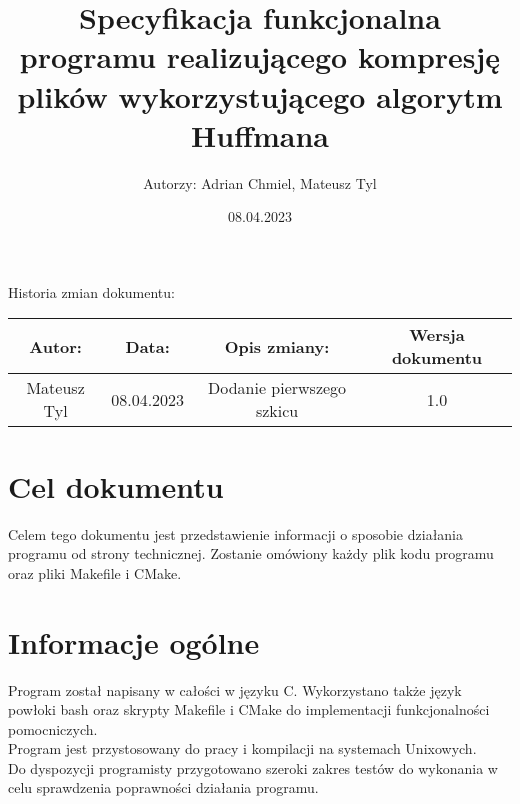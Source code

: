 \documentclass[]{article}
\title{Specyfikacja funkcjonalna programu realizującego kompresję plików wykorzystującego algorytm Huffmana}
\author{Autorzy: Adrian Chmiel, Mateusz Tyl}
\date{08.04.2023}
\begin{document}
\maketitle
\begin{center}
Historia zmian dokumentu:\\
\end{center}

\begin{tabular}{|c|c|c|c|}
  \hline 
  Autor: & Data: & Opis zmiany:& Wersja dokumentu \\
  \hline
  Mateusz Tyl & 08.04.2023 & Dodanie pierwszego szkicu & 1.0 \\
\end{tabular} 
\section{Cel dokumentu}\label{header-n231}

Celem tego dokumentu jest przedstawienie informacji o sposobie działania programu od strony technicznej. Zostanie omówiony każdy plik kodu programu oraz pliki Makefile i CMake.
\section{Informacje ogólne}\label{header-n231}
Program został napisany w całości w języku C. Wykorzystano także język powłoki bash oraz skrypty Makefile i CMake do implementacji funkcjonalności pomocniczych.\\
Program jest przystosowany do pracy i kompilacji na systemach Unixowych.\\
Do dyspozycji programisty przygotowano szeroki zakres testów do wykonania w celu sprawdzenia poprawności działania programu.
\end{document}
